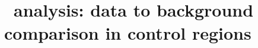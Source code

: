 \clearpage{\pagestyle{empty}\cleardoublepage}

\chapter{\htx\ analysis: data to background comparison in control regions}\label{app:htxcontrol}


